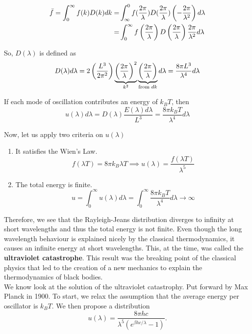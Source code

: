 \begin{align}
    \bar{f}=\int_{0}^{\infty}f(k)D(k)dk=&\int_{\infty}^{0}f(\frac{2\pi}{\lambda})D(\frac{2\pi}{\lambda})\left( -\frac{2\pi}{\lambda^2} \right)d\lambda \notag\\
    =& \int_{0}^{\infty}f\left( \frac{2\pi}{\lambda} \right)D\left( \frac{2\pi}{\lambda} \right)\frac{2\pi}{\lambda^2}d\lambda
\end{align}

So, $D(\lambda)$ is defined as
\begin{equation}
    D(\lambda)d\lambda = 2\left( \frac{L^3}{2\pi^2} \right)\underbrace{\left( \frac{2\pi}{\lambda} \right)^2}_{k^2}\underbrace{\left( \frac{2\pi}{\lambda} \right)}_{\text{from }dk}d\lambda = \frac{8\pi L^3}{\lambda^4}d\lambda
\end{equation}

If each mode of oscillation contributes an energy of $k_BT$, then
\begin{equation}
    u(\lambda)d\lambda=D(\lambda)\frac{E(\lambda)d\lambda}{L^3}=\frac{8\pi k_BT}{\lambda^4}d\lambda
\end{equation}

Now, let us apply two criteria on $u(\lambda)$
\begin{enumerate}
    \item It satisfies the Wien's Law.
        \begin{equation}
            f(\lambda T)=8\pi k_B\lambda T \implies u(\lambda) = \frac{f(\lambda T)}{\lambda^5}
        \end{equation}
    \item The total energy is finite.
        \begin{equation}
            u = \int_{0}^{\infty}u(\lambda)d\lambda = \int_{0}^{\infty}\frac{8\pi k_BT}{\lambda^4}d\lambda \to \infty
        \end{equation}
\end{enumerate}

Therefore, we see that the Rayleigh-Jeans distribution diverges to infinity at short wavelengths and thus the total energy is not finite. Even though the long wavelength behaviour is explained nicely by the classical thermodynamics, it causes an infinite energy at short wavelengths. This, at the time, was called the \textbf{ultraviolet catastrophe}. This result was the breaking point of the classical physics that led to the creation of a new mechanics to explain the thermodynamics of black bodies. \\
\linebreak
We know look at the solution of the ultraviolet catastrophy. Put forward by Max Planck in 1900. To start, we relax the assumption that the average energy per oscillator is $k_BT$. We then propose a distribution
\begin{equation}
    u(\lambda) = \frac{8\pi hc}{\lambda^5(e^{\beta hc/\lambda}-1)}.
\end{equation}

